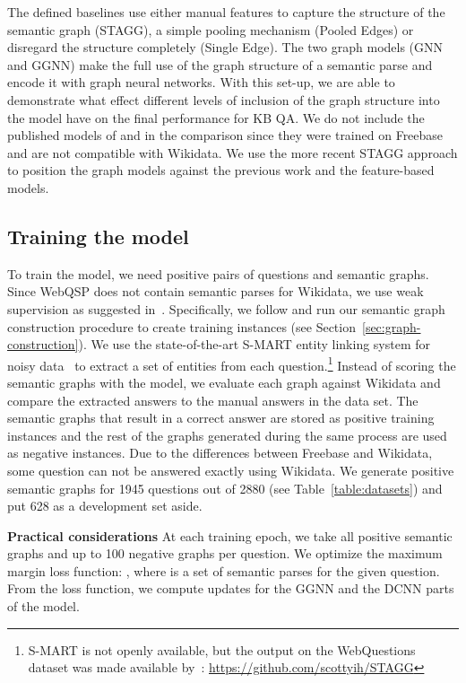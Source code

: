 \documentclass[11pt]{article}
\begin{document}
The defined baselines use either manual features to capture the structure of the semantic graph (STAGG), a simple pooling mechanism (Pooled Edges) or disregard the structure completely (Single Edge). The two graph models (GNN and GGNN) make the full use of the graph structure of a semantic parse and encode it with graph neural networks. With this set-up, we are able to demonstrate what effect different levels of inclusion of the graph structure into the model have on the final performance for KB QA. We do not include the published models of  and  in the comparison since they were trained on Freebase and are not compatible with Wikidata. We use the more recent STAGG approach to position the graph models against the previous work and the feature-based models.

\subsection{Training the model}

To train the model, we need positive pairs of questions and semantic graphs. Since WebQSP does not contain semantic parses for Wikidata, we use weak supervision as suggested in~. 
Specifically, we follow  and run our semantic graph construction procedure to create training instances (see Section~\ref{sec:graph-construction}). 
We use the state-of-the-art S-MART entity linking system for noisy data~\cite{Yang2015a} to extract a set of entities  from each question.\footnote{S-MART is not openly available, but the output on the WebQuestions dataset was made available by~: \url{https://github.com/scottyih/STAGG}}
Instead of scoring the semantic graphs with the model, we evaluate each graph against Wikidata and compare the extracted answers to the manual answers in the data set. The semantic graphs that result in a correct answer are stored as positive training instances and the rest of the graphs generated during the same process are used as negative instances. 
Due to the differences between Freebase and Wikidata, some question can not be answered exactly using Wikidata.
We generate positive semantic graphs for 1945 questions out of 2880 (see Table~\ref{table:datasets}) and put 628 as a development set aside.


\textbf{Practical considerations}
At each training epoch, we take all positive semantic graphs and up to 100 negative graphs per question. We optimize the maximum margin loss function: , where  is a set of semantic parses for the given question. From the loss function, we compute updates for the GGNN and the DCNN parts of the model.
\end{document}
